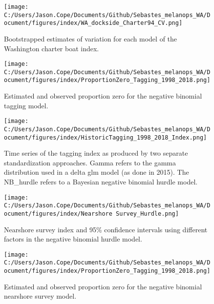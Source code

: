 \documentclass[11pt,
  english,
  letterpaper,
]{article}
\begin{document}
\pagebreak

\begin{figure}
\centering
\texttt{[image: C:/Users/Jason.Cope/Documents/Github/Sebastes\_melanops\_WA/Document/figures/index/WA\_dockside\_Charter94\_CV.png]}
\caption{Bootstrapped estimates of variation for each model of the Washington charter boat index.\label{fig:charter-CVs}}
\end{figure}

\pagebreak

\begin{figure}
\centering
\texttt{[image: C:/Users/Jason.Cope/Documents/Github/Sebastes\_melanops\_WA/Document/figures/index/ProportionZero\_Tagging\_1998\_2018.png]}
\caption{Estimated and observed proportion zero for the negative binomial tagging model.\label{fig:prop-zero-tag}}
\end{figure}

\pagebreak

\begin{figure}
\centering
\texttt{[image: C:/Users/Jason.Cope/Documents/Github/Sebastes\_melanops\_WA/Document/figures/index/HistoricTagging\_1998\_2018\_Index.png]}
\caption{Time series of the tagging index as produced by two separate standardization approaches. Gamma refers to the gamma distribution used in a delta glm model (as done in 2015). The NB\_hurdle refers to a Bayesian negative binomial hurdle model.\label{fig:tag-index}}
\end{figure}

\pagebreak

\begin{figure}
\centering
\texttt{[image: C:/Users/Jason.Cope/Documents/Github/Sebastes\_melanops\_WA/Document/figures/index/Nearshore Survey\_Hurdle.png]}
\caption{Nearshore survey index and 95\% confidence intervals using different factors in the negative binomial hurdle model.\label{fig:model-sel-nearshore}}
\end{figure}

\pagebreak

\begin{figure}
\centering
\texttt{[image: C:/Users/Jason.Cope/Documents/Github/Sebastes\_melanops\_WA/Document/figures/index/ProportionZero\_Tagging\_1998\_2018.png]}
\caption{Estimated and observed proportion zero for the negative binomial nearshore survey model.\label{fig:prop-zero-nearshore}}
\end{figure}
\end{document}
